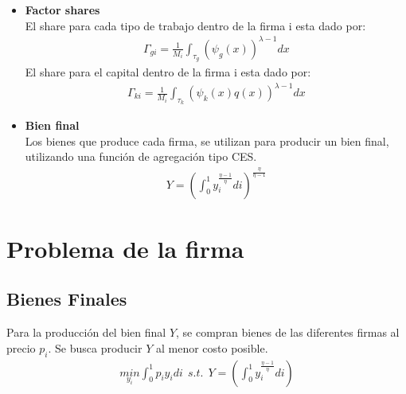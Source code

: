 \documentclass{article}
\theoremstyle{remark}
\theoremstyle{definition}
\begin{document}
\begin{itemize}
    Ahora podemos definir los conjuntos $\tau_{f}; \ f \in \{l_{c},l_{r},l_{s},l_{j},K\}$, los cuales contienen las tareas asignadas a cada tipo de trabajo y al capital:

    \begin{align*}
        \tau_{g}&=\left\{x \middle|  \frac{w_{g}}{A_{g}\psi_{g}(x)} < \frac{w_{g'}}{A_{g'}\psi_{g'}(x)} \leq \frac{1}{A_{k}\psi_{k}(x)q(x)} \right\} \\
        \tau_{k}&=\left\{x \middle| \frac{1}{A_{k}\psi_{k}(x)q(x)} < \frac{w_{g}}{A_{g}\psi_{g}(x)} \right\}
    \end{align*}
    \item \textbf{Factor shares} \\
    El share para cada tipo de trabajo dentro de la firma i esta dado por:
    \begin{align*}
        \Gamma_{gi} = \frac{1}{M_i}\int_{{\tau}_{g}}\left(\psi_g(x)\right)^{\lambda-1}dx
    \end{align*}
    El share para el capital dentro de la firma i esta dado por:
    \begin{align*}
        \Gamma_{ki} = \frac{1}{M_i}\int_{{\tau}_{k}}\left(\psi_k(x)q(x)\right)^{\lambda-1}dx
    \end{align*}
    \item \textbf{Bien final} \\
    Los bienes que produce cada firma, se utilizan para producir un bien final, utilizando una funci\'on de agregaci\'on tipo CES.
    \begin{align*}
        Y=\left(\int_{0}^{1}y_i^{\frac{\eta-1}{\eta}}di\right)^{\frac{\eta}{\eta-1}}
    \end{align*}
\end{itemize}


\section{Problema de la firma}
\subsection{Bienes Finales}
Para la producci\'on del bien final $Y$, se compran bienes de las diferentes firmas al precio $p_i$. Se busca producir $Y$ al menor costo posible.
\begin{align*}
    \underset{y_i}{min}\int_{0}^{1} p_iy_i di \ \ s.t. \ \ Y=\left(\int_{0}^{1}y_{i}^{\frac{\eta -1}{\eta}}di\right)
\end{align*}
\end{document}

